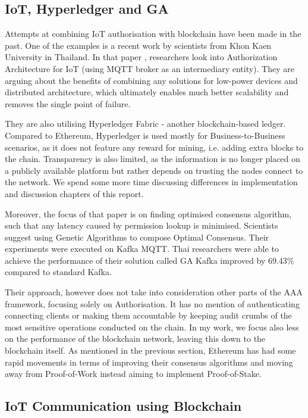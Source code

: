 \subsection{IoT, Hyperledger and GA}
Attempts at combining IoT authorisation with blockchain have been made in the past. One of the examples is a recent work by scientists from Khon Kaen University in Thailand. In that paper \cite{klaokliang2018novel}, researchers look into Authorization Architecture for IoT (using MQTT broker as an intermediary entity). They are arguing about the benefits of combining any solutions for low-power devices and distributed architecture, which ultimately enables much better scalability and removes the single point of failure.

They are also utilising Hyperledger Fabric - another blockchain-based ledger. Compared to Ethereum, Hyperledger \cite{cachin2016architecture} is used mostly for Business-to-Business scenarios, as it does not feature any reward for mining, i.e. adding extra blocks to the chain. Transparency is also limited, as the information is no longer placed on a publicly available platform but rather depends on trusting the nodes connect to the network. We spend some more time discussing differences in implementation and discussion chapters of this report.

Moreover, the focus of that paper is on finding optimised consensus algorithm, such that any latency caused by permission lookup is minimised. Scientists suggest using Genetic Algorithms to compose Optimal Consensus. Their experiments were executed on Kafka MQTT\cite{waehner_2019}. Thai researchers were able to achieve the performance of their solution called GA Kafka improved by 69.43\% compared to standard Kafka.

Their approach, however does not take into consideration other parts of the AAA framework, focusing solely on Authorisation. It has no mention of authenticating connecting clients or making them accountable by keeping audit crumbs of the most sensitive operations conducted on the chain. In my work, we focus also less on the performance of the blockchain network, leaving this down to the blockchain itself. As mentioned in the previous section, Ethereum has had some rapid movements in terms of improving their consensus algorithms and moving away from Proof-of-Work instead aiming to implement Proof-of-Stake.

\subsection{IoT Communication using Blockchain}

